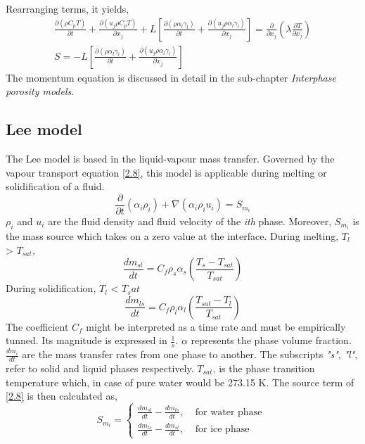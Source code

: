 Rearranging terms, it yields,
\begin{equation}
	\begin{aligned}
		\frac{\partial (\rho C_{p} T)}{\partial t}+ \frac{\partial (u_{j}\rho C_{p} T)}{\partial x_{j}}+L\left[\frac{\partial (\rho \alpha_{l}\gamma_{l})}{\partial t}+ \frac{\partial (u_{j}\rho \alpha_{l}\gamma_{l})}{\partial x_{j}}\right]=\frac{\partial}{\partial x_{j}}\left(\lambda \frac{\partial T}{\partial x_{j}}\right)  \\
		S = -L\left[\frac{\partial (\rho \alpha_{l}\gamma_{l})}{\partial t}+ \frac{\partial (u_{j}\rho \alpha_{l}\gamma_{l})}{\partial x_{j}}\right]
	\end{aligned}
	\label{2.7}
\end{equation}
The momentum equation is discussed in detail in the sub-chapter \textit{Interphase porosity models}.

\subsection{Lee model}
The Lee model is based in the liquid-vapour mass transfer. Governed by the vapour transport equation \ref{2.8}, this model is applicable during melting or solidification of a fluid.
\begin{equation}
\frac{\partial}{\partial t}\left(\alpha_{i} \rho_{i}\right)+\nabla\left(\alpha_{i} \rho_{i} {u}_{i}\right)=S_{m _i}
\label{2.8}
\end{equation}
\textit{$\rho_i$} and \textbf{$u_i$} are the fluid density and fluid velocity of the \textit{i{th}} phase. Moreover, $S_{m_i}$ is the mass source which takes on a zero value at the interface.
\newline
During melting, $T_l$ > $T_{sat}$,
\begin{equation}
\frac{d m_{s l}}{d t}=C_{f} \rho_{s} \alpha_{s}\left(\frac{T_{s}-T_{s a t}}{T_{s a t}}\right)
\label{2.9}
\end{equation}
During solidification, $T_l$ < $T_sat$
\begin{equation}
\label{2.10}
\frac{d m_{l s}}{d t}=C_{f} \rho_{l} \alpha_{l}\left(\frac{T_{s a t}-T_{l}}{T_{s a t}}\right)
\end{equation}
The coefficient $C_f$ might be interpreted as a time rate and must be empirically tunned. Its magnitude is expressed in $\frac{1}{s}$. $\alpha$ represents the phase volume fraction. $\frac{d m_{i}}{d t}$ are the mass transfer rates from one phase to another. The subscripts \textit{"s"}, \textit{"l"}, refer to solid and liquid phases respectively. \textit{$T_{sat}$}, is the phase transition temperature which, in case of pure water would be 273.15 K.
The source term of \ref{2.8} is then calculated as,
\begin{equation}
\label{2.11}
S_{m_{i}}=\left\{\begin{array}{lr}
\frac{d m_{s l}}{d t}-\frac{d m_{l s}}{d t}, & \text { for water phase } \\
\frac{d m_{l s}}{d t}-\frac{d m_{s l}}{d t}, & \text { for ice phase }
\end{array}\right.
\end{equation}  
